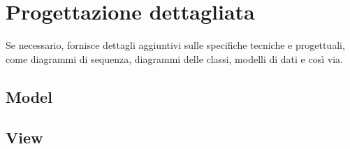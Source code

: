 \section{Progettazione dettagliata}\label{sec:Progettazione}
 Se necessario, fornisce dettagli aggiuntivi sulle specifiche 
 tecniche e progettuali, come diagrammi di sequenza, 
 diagrammi delle classi, modelli di dati e così via. 
 
 \subsection{Model}\label{ssec:Model}
 \subsection{View}\label{ssec:View}

 \newpage